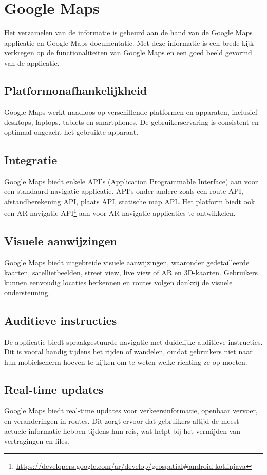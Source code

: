 \section{Google Maps}
\label{sec:google maps}

Het verzamelen van de informatie is gebeurd aan de hand van de Google Maps applicatie en Google Maps documentatie. Met deze informatie is een brede kijk verkregen op de functionaliteiten van Google Maps en een goed beeld gevormd van de applicatie.

\subsection*{Platformonafhankelijkheid}
Google Maps werkt naadloos op verschillende platformen en apparaten, inclusief desktops, laptops, tablets en smartphones. De gebruikerservaring is consistent en optimaal ongeacht het gebruikte apparaat.

\subsection*{Integratie}

Google Maps biedt enkele API's (Application Programmable Interface) aan voor een standaard navigatie applicatie. API's onder andere zoals een route API, afstandberekening API, plaats API, statische map API\ldots Het platform biedt ook een AR-navigatie API\footnote{\url{https://developers.google.com/ar/develop/geospatial\#android-kotlinjava}} aan voor AR navigatie applicaties te ontwikkelen.

\subsection*{Visuele aanwijzingen}
Google Maps biedt uitgebreide visuele aanwijzingen, waaronder gedetailleerde kaarten, satellietbeelden, street view, live view of AR en 3D-kaarten. Gebruikers kunnen eenvoudig locaties herkennen en routes volgen dankzij de visuele ondersteuning.

\subsection*{Auditieve instructies}
De applicatie biedt spraakgestuurde navigatie met duidelijke auditieve instructies. Dit is vooral handig tijdens het rijden of wandelen, omdat gebruikers niet naar hun mobielscherm hoeven te kijken om te weten welke richting ze op moeten.

\subsection*{Real-time updates}
Google Maps biedt real-time updates voor verkeersinformatie, openbaar vervoer, en veranderingen in routes. Dit zorgt ervoor dat gebruikers altijd de meest actuele informatie hebben tijdens hun reis, wat helpt bij het vermijden van vertragingen en files.


